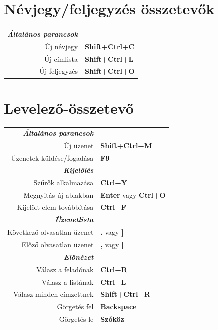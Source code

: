 \documentclass[12pt]{article}
\begin{document}
\begin{landscape}
\begin{center}
\begin{multicols}{2}
	\section*{Névjegy/feljegyzés összetevők}
	\begin{tabular*}{4in}{rp{1.5in}}
		\textit{\textbf{Általános parancsok}}	&					\\
		Új névjegy				& \textbf{Shift+Ctrl+C}			\\
		Új címlista				& \textbf{Shift+Ctrl+L}			\\
		Új feljegyzés				& \textbf{Shift+Ctrl+O}			\\
	\end{tabular*}
	\section*{Levelező-összetevő}
	\begin{tabular*}{4in}{rp{1.5in}}
		\textit{\textbf{Általános parancsok}}	&					\\
		Új üzenet				& \textbf{Shift+Ctrl+M}			\\
		\vspace{1.5mm}
		Üzenetek küldése/fogadása		& \textbf{F9}				\\
		\textit{\textbf{Kijelölés}}		&					\\
		Szűrők alkalmazása			& \textbf{Ctrl+Y}			\\
		Megnyitás új ablakban			& \textbf{Enter} vagy \textbf{Ctrl+O}	\\
		\vspace{1.5mm}
		Kijelölt elem továbbítása		& \textbf{Ctrl+F}			\\
		\textit{\textbf{Üzenetlista}}		&					\\
		Következő olvasatlan üzenet		& \textbf{.} vagy \textbf{]}		\\
		\vspace{1.5mm}
		Előző olvasatlan üzenet			& \textbf{,} vagy \textbf{[}		\\
		\textit{\textbf{Előnézet}}	&					\\
		Válasz a feladónak			& \textbf{Ctrl+R}			\\
		Válasz a listának			& \textbf{Ctrl+L}			\\
		Válasz minden címzettnek		& \textbf{Shift+Ctrl+R}			\\
		Görgetés fel				& \textbf{Backspace}			\\
		Görgetés le				& \textbf{Szóköz}			\\
	\end{tabular*}

\end{multicols}
\end{center}
\end{landscape}
\end{document}
